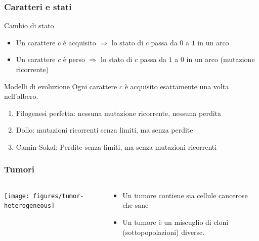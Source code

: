 



\begin{frame}
\frametitle{Caratteri e stati}

\begin{block}{Cambio di stato}
  \begin{itemize}
\item  Un carattere $c$ è  \alert{acquisito} $\Rightarrow$ lo stato di  $c$ passa da  $0$ a $1$
  in un arco
  \item  Un carattere $c$ è \alert{perso} $\Rightarrow$   lo stato di  $c$ passa da  $1$ a $0$
  in un arco (\alert{mutazione ricorrente})
\end{itemize}
\end{block}

\begin{block}{Modelli di evoluzione}
Ogni carattere $c$ è  acquisito \alert{esattamente una volta} nell'albero.
\begin{enumerate}
\item
  Filogenesi perfetta: nessuna mutazione ricorrente, nessuna perdita
\item
  \alert{Dollo}:
  mutazioni ricorrenti senza limiti, ma senza perdite
\item
  \alert{Camin-Sokal}:
  Perdite senza limiti, ma senza mutazioni ricorrenti
\end{enumerate}
\end{block}
\end{frame}


\begin{frame}
\frametitle{Tumori}
\begin{columns}
\begin{column}{0.75\textwidth}
\centering
\texttt{[image: figures/tumor-heterogeneous]}
\end{column}
\begin{column}{0.25\textwidth}
\begin{itemize}
\item
Un \alert{tumore} contiene sia cellule cancerose che sane
\item
Un \alert{tumore} è un miscuglio di cloni (sottopopolazioni) diverse.
\end{itemize}
\end{column}
\end{columns}
\end{frame}


